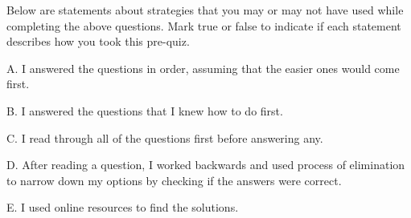 \documentclass{ximera}
\begin{document}
\begin{question}

Below are statements about strategies that you may or may not have used while completing the above questions.  Mark true or false to indicate if each statement describes how you took this pre-quiz. 

\begin{question}

A. I answered the questions in order, assuming that the easier ones would come first.

    \begin{multipleChoice}
    \end{multipleChoice}
    
\end{question}
\begin{question}
    
    B. I answered the questions that I knew how to do first.

    \begin{multipleChoice}
    \end{multipleChoice}
    
\end{question}
\begin{question}
    
    C. I read through all of the questions first before answering any.

    \begin{multipleChoice}
    \end{multipleChoice}
    
\end{question}
\begin{question}
    
    D. After reading a question, I worked backwards and used process of elimination to narrow down my options by checking if the answers were correct.

    \begin{multipleChoice}
    \end{multipleChoice}
    
\end{question}
\begin{question}    
    
    E. I used online resources to find the solutions.


\end{question}
\end{question}
\end{document}
